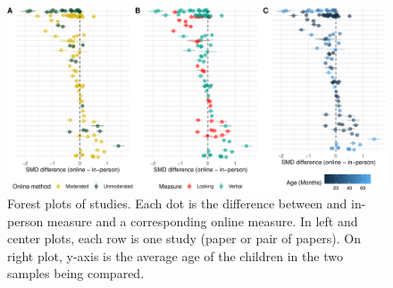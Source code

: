 \documentclass[
  man,floatsintext]{apa6}
\begin{document}
\begin{figure}[h]

{\centering \includegraphics[width=1\linewidth]{OnlineMA_main_files/figure-latex/forest-1} 

}

\caption{Forest plots of studies. Each dot is the difference between and in-person measure and a corresponding online measure. In left and center plots, each row is one study (paper or pair of papers). On right plot, y-axis is the average age of the children in the two samples being compared.}\label{fig:forest}
\end{figure}
\end{document}
